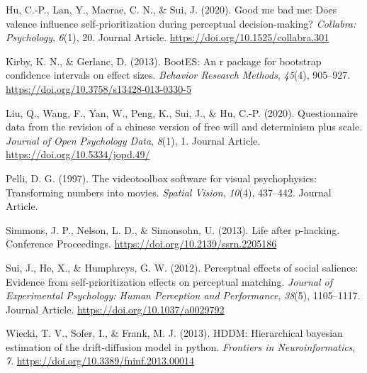 \documentclass[
  english,
  man]{apa6}
\begin{document}
\leavevmode\hypertarget{ref-Hu_2020_GoodSelf}{}%
Hu, C.-P., Lan, Y., Macrae, C. N., \& Sui, J. (2020). Good me bad me: Does valence influence self-prioritization during perceptual decision-making? \emph{Collabra: Psychology}, \emph{6}(1), 20. Journal Article. \url{https://doi.org/10.1525/collabra.301}

\leavevmode\hypertarget{ref-kirby_bootes_2013}{}%
Kirby, K. N., \& Gerlanc, D. (2013). BootES: An r package for bootstrap confidence intervals on effect sizes. \emph{Behavior Research Methods}, \emph{45}(4), 905--927. \url{https://doi.org/10.3758/s13428-013-0330-5}

\leavevmode\hypertarget{ref-Liu_2020_JOPD}{}%
Liu, Q., Wang, F., Yan, W., Peng, K., Sui, J., \& Hu, C.-P. (2020). Questionnaire data from the revision of a chinese version of free will and determinism plus scale. \emph{Journal of Open Psychology Data}, \emph{8}(1), 1. Journal Article. \url{https://doi.org/10.5334/jopd.49/}

\leavevmode\hypertarget{ref-Pelli_1997}{}%
Pelli, D. G. (1997). The videotoolbox software for visual psychophysics: Transforming numbers into movies. \emph{Spatial Vision}, \emph{10}(4), 437--442. Journal Article.

\leavevmode\hypertarget{ref-Simmons_2013_life}{}%
Simmons, J. P., Nelson, L. D., \& Simonsohn, U. (2013). Life after p-hacking. Conference Proceedings. \url{https://doi.org/10.2139/ssrn.2205186}

\leavevmode\hypertarget{ref-Sui_2012_JEPHPP}{}%
Sui, J., He, X., \& Humphreys, G. W. (2012). Perceptual effects of social salience: Evidence from self-prioritization effects on perceptual matching. \emph{Journal of Experimental Psychology: Human Perception and Performance}, \emph{38}(5), 1105--1117. Journal Article. \url{https://doi.org/10.1037/a0029792}

\leavevmode\hypertarget{ref-wiecki_hddm_2013}{}%
Wiecki, T. V., Sofer, I., \& Frank, M. J. (2013). HDDM: Hierarchical bayesian estimation of the drift-diffusion model in python. \emph{Frontiers in Neuroinformatics}, \emph{7}. \url{https://doi.org/10.3389/fninf.2013.00014}

\endgroup
\end{document}
